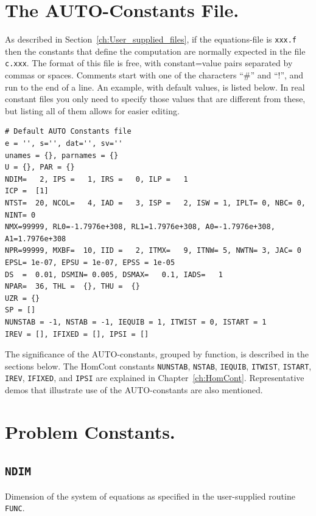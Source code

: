 \documentclass[12pt]{report}
\begin{document}
\section{ The {\cal AUTO}-Constants File.} \label{sec:The_AUTO_constants_file}
As described in Section~\ref{ch:User_supplied_files}, 
if the equations-file is {\tt xxx.f} 
then the constants that define the computation 
are normally expected in the file  {\tt c.xxx}.
The format of this file is free, with constant=value pairs separated
by commas or spaces. Comments start with one of the characters  ``\#''
and ``!'', and run to the end of a line.
An example, with default values, is listed below. In real constant
files you only need to specify those values that are different from
these, but listing all of them allows for easier editing.

\begin{verbatim}
# Default AUTO Constants file
e = '', s='', dat='', sv=''
unames = {}, parnames = {}
U = {}, PAR = {}
NDIM=   2, IPS =   1, IRS =   0, ILP =   1
ICP =  [1]
NTST=  20, NCOL=   4, IAD =   3, ISP =   2, ISW = 1, IPLT= 0, NBC= 0, NINT= 0
NMX=99999, RL0=-1.7976e+308, RL1=1.7976e+308, A0=-1.7976e+308, A1=1.7976e+308
NPR=99999, MXBF=  10, IID =   2, ITMX=   9, ITNW= 5, NWTN= 3, JAC= 0
EPSL= 1e-07, EPSU = 1e-07, EPSS = 1e-05
DS  =  0.01, DSMIN= 0.005, DSMAX=   0.1, IADS=   1
NPAR=  36, THL =  {}, THU =  {}
UZR = {}
SP = []
NUNSTAB = -1, NSTAB = -1, IEQUIB = 1, ITWIST = 0, ISTART = 1
IREV = [], IFIXED = [], IPSI = []
\end{verbatim}

The significance of the {\cal AUTO}-constants, grouped by function, is 
described in the sections below. The HomCont constants \texttt{NUNSTAB},
\texttt{NSTAB}, \texttt{IEQUIB}, \texttt{ITWIST}, \texttt{ISTART},
\texttt{IREV}, \texttt{IFIXED}, and \texttt{IPSI} are explained in
Chapter~\ref{ch:HomCont}.
Representative demos that illustrate use of the {\cal AUTO}-constants
are also mentioned.

\section{ Problem Constants.} \label{sec:Problem_constants}
\subsection{\tt NDIM} \label{sec:NDIM}
 Dimension of the system of equations as specified in the user-supplied
 routine {\tt FUNC}.
\end{document}
